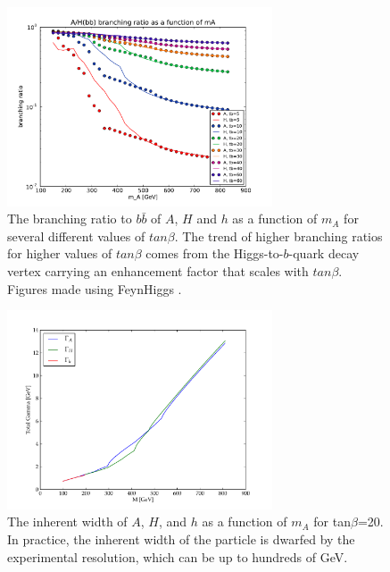 \begin{figure}
	\centering
	\includegraphics[width=0.7\textwidth]{Theory/figures/mssm_xsec/AH_br_vs_mass.pdf}
	\caption{The branching ratio to $b\bar{b}$ of $A$, $H$ 
    and $h$ as a function of $m_A$ for 
    several different values of $tan\beta$. The trend of higher branching 
    ratios for higher values of $tan\beta$ comes from the Higgs-to-$b$-quark 
    decay vertex carrying an enhancement factor that scales with $tan\beta$.
    Figures made using FeynHiggs \cite{feynhiggs_1} \cite{feynhiggs_2}
    \cite{feynhiggs_3} \cite{feynhiggs_4} \cite{feynhiggs_5}.
    \label{fig:br_vs_mass} }
\end{figure}


\begin{figure}
	\centering
	\includegraphics[width=0.7\textwidth]{Theory/figures/gamma.pdf}
	\caption{The inherent width of $A$, $H$, and $h$ 
    as a function of $m_A$ for tan$\beta$=20.  
    In practice, the inherent width of the particle is dwarfed by the experimental 
    resolution, which can be up to hundreds of GeV.  \label{fig:width}}
\end{figure}



